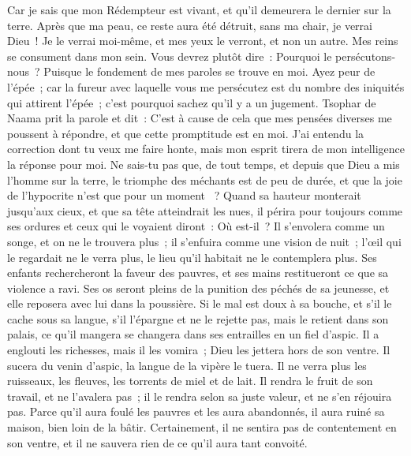 \begin{multicols}{2}
Car je sais que mon Rédempteur est vivant, et qu'il demeurera le dernier sur la terre.
Après que ma peau, ce reste aura été détruit, sans ma chair, je verrai Dieu~!
Je le verrai moi-même, et mes yeux le verront, et non un autre. Mes reins se consument dans mon sein. 
Vous devrez plutôt dire~: Pourquoi le persécutons-nous~? Puisque le fondement de mes paroles se trouve en moi.
Ayez peur de l'épée~; car la fureur avec laquelle vous me persécutez est du nombre des iniquités qui attirent l'épée~; c'est pourquoi sachez qu'il y a un jugement.
\VerseOne{}Tsophar de Naama prit la parole et dit~:
C'est à cause de cela que mes pensées diverses me poussent à répondre, et que cette promptitude est en moi. 
J'ai entendu la correction dont tu veux me faire honte, mais mon esprit tirera de mon intelligence la réponse pour moi. 
Ne sais-tu pas que, de tout temps, et depuis que Dieu a mis l'homme sur la terre, 
le triomphe des méchants est de peu de durée, et que la joie de l'hypocrite n'est que pour un moment ~?
Quand sa hauteur monterait jusqu'aux cieux, et que sa tête atteindrait les nues,
il périra pour toujours comme ses ordures et ceux qui le voyaient diront~: Où est-il~?
Il s'envolera comme un songe, et on ne le trouvera plus~; il s'enfuira comme une vision de nuit~;
l'œil qui le regardait ne le verra plus, le lieu qu'il habitait ne le contemplera plus.
Ses enfants rechercheront la faveur des pauvres, et ses mains restitueront ce que sa violence a ravi.
Ses os seront pleins de la punition des péchés de sa jeunesse, et elle reposera avec lui dans la poussière.
Si le mal est doux à sa bouche, et s'il le cache sous sa langue,
s'il l'épargne et ne le rejette pas, mais le retient dans son palais, 
ce qu'il mangera se changera dans ses entrailles en un fiel d'aspic.
Il a englouti les richesses, mais il les vomira~; Dieu les jettera hors de son ventre.
Il sucera du venin d'aspic, la langue de la vipère le tuera.
Il ne verra plus les ruisseaux, les fleuves, les torrents de miel et de lait.
Il rendra le fruit de son travail, et ne l'avalera pas~; il le rendra selon sa juste valeur, et ne s'en réjouira pas.
Parce qu'il aura foulé les pauvres et les aura abandonnés, il aura ruiné sa maison, bien loin de la bâtir. 
Certainement, il ne sentira pas de contentement en son ventre, et il ne sauvera rien de ce qu'il aura tant convoité.

\end{multicols}
